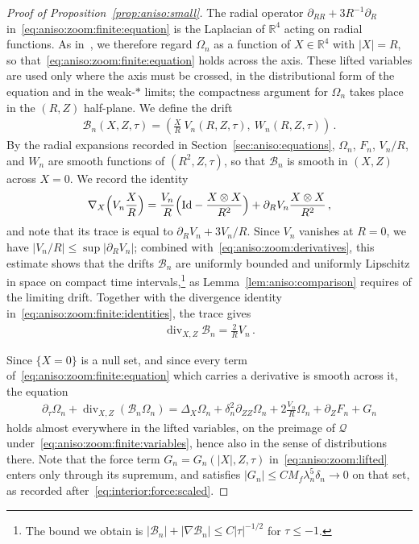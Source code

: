 \documentclass[11pt,reqno]{amsproc}
\numberwithin{equation}{section}
\theoremstyle{remark}
\newcommand{\p}{\partial}
\newcommand{\RR}{\mathbb R}
\renewcommand{\div}{\operatorname{div}}
\begin{document}
\begin{proof}[Proof of Proposition~\ref{prop:aniso:small}]
The radial operator $\p_{RR}+3R^{-1}\p_R$ in~\eqref{eq:aniso:zoom:finite:equation} is the Laplacian of $\RR^4$ acting on radial functions. As in~\cite{KNSS09}, we therefore regard $\Omega_n$ as a function of $X\in\RR^4$ with $|X|=R$, so that~\eqref{eq:aniso:zoom:finite:equation} holds across the axis. These lifted variables are used only where the axis must be crossed, in the distributional form of the equation and in the weak-$*$ limits; the compactness argument for $\Omega_n$ takes place in the $(R,Z)$ half-plane. We define the drift
\begin{align}
\mathcal B_n(X,Z,\tau)
=\left(\frac X R \ V_n(R,Z,\tau),\ W_n(R,Z,\tau)\right)
\,.
\label{eq:drift:Bn:def}
\end{align}
By the radial expansions recorded in Section~\ref{sec:aniso:equations}, $\Omega_n$, $F_n$, $V_n/R$, and $W_n$ are smooth functions of $(R^2,Z,\tau)$, so that $\mathcal B_n$ is smooth in $(X,Z)$ across $X=0$. We record the identity
\begin{align*}
\nabla_X\Bigl(V_n\frac XR\Bigr)
=\frac{V_n}{R}\Bigl(\mathrm{Id}-\frac{X\otimes X}{R^2}\Bigr)+\p_RV_n\frac{X\otimes X}{R^2}
\,,
\end{align*}
and note that its trace is equal to $\p_RV_n+3V_n/R$. Since $V_n$ vanishes at $R=0$, we have $|V_n/R|\le\sup|\p_RV_n|$; combined with~\eqref{eq:aniso:zoom:derivatives}, this estimate shows that the drifts $\mathcal B_n$ are uniformly bounded and uniformly Lipschitz in space on compact time intervals,\footnote{The bound we obtain is $|\mathcal B_n|+|\nabla\mathcal B_n|\le C|\tau|^{-1/2}$ for $\tau\le-1$.} as Lemma~\ref{lem:aniso:comparison} requires of the limiting drift. Together with the divergence identity in~\eqref{eq:aniso:zoom:finite:identities}, the trace gives
\begin{align*}
\div_{X,Z}\mathcal B_n=\frac{2}{R} V_n
\,.
\end{align*}

Since $\{X=0\}$ is a null set, and since every term of~\eqref{eq:aniso:zoom:finite:equation} which carries a derivative is smooth across it, the equation
\begin{align}
\p_\tau \Omega_n+\div_{X,Z}(\mathcal B_n\Omega_n)
=\Delta_X\Omega_n+\delta_n^2\p_{ZZ}\Omega_n
+2\frac{V_n}{R}\Omega_n+\p_ZF_n+G_n
\label{eq:aniso:zoom:lifted}
\end{align}
holds almost everywhere in the lifted variables, on the preimage of $\mathcal Q$ under~\eqref{eq:aniso:zoom:finite:variables}, hence also in the sense of distributions there. Note that the force term $G_n=G_n(|X|,Z,\tau)$ in~\eqref{eq:aniso:zoom:lifted} enters only through its supremum, and satisfies $|G_n|\le CM_f\lambda_n^5\delta_n\to0$ on that set, as recorded after~\eqref{eq:interior:force:scaled}.


\end{proof}
\end{document}
